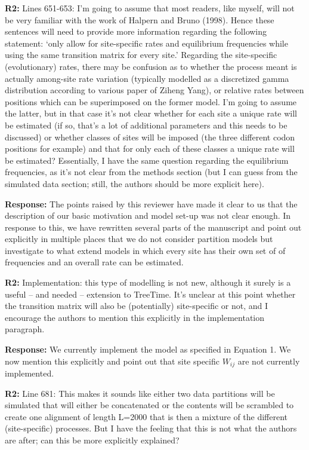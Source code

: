 \documentclass[aps,rmp,onecolumn]{revtex4-1}
\newcommand{\refb}[1]{\textbf{R2:} #1}
\newcommand{\response}[1]{{\color{black}\textbf{Response:} #1}}
\begin{document}
\refb{Lines 651-653: I’m going to assume that most readers, like myself, will not be very familiar with the work of Halpern and Bruno (1998). Hence these sentences will need to provide more information regarding the following statement: ‘only allow for site-specific rates and equilibrium frequencies while using the same transition matrix for every site.’ Regarding the site-specific (evolutionary) rates, there may be confusion as to whether the process meant is actually among-site rate variation (typically modelled as a discretized gamma distribution according to various paper of Ziheng Yang), or relative rates between positions which can be superimposed on the former model. I’m going to assume the latter, but in that case it’s not clear whether for each site a unique rate will be estimated (if so, that’s a lot of additional parameters and this needs to be discussed) or whether classes of sites will be imposed (the three different codon positions for example) and that for only each of these classes a unique rate will be estimated? Essentially, I have the same question regarding the equilibrium frequencies, as it’s not clear from the methods section (but I can guess from the simulated data section; still, the authors should be more explicit here).}

\response{
The points raised by this reviewer have made it clear to us that the description of our basic motivation and model set-up was not clear enough. In response to this, we have rewritten several parts of the manuscript and point out explicitly in multiple places that we do not consider partition models but investigate to what extend models in which every site has their own set of of frequencies and an overall rate can be estimated. }


\refb{Implementation: this type of modelling is not new, although it surely is a useful -- and needed -- extension to TreeTime. It’s unclear at this point whether the transition matrix will also be (potentially) site-specific or not, and I encourage the authors to mention this explicitly in the implementation paragraph.}

\response{We currently implement the model as specified in Equation 1. We now mention this explicitly and point out that site specific $W_{ij}$ are not currently implemented.}


\refb{Line 681: This makes it sounds like either two data partitions will be simulated that will either be concatenated or the contents will be scrambled to create one alignment of length L=2000 that is then a mixture of the different (site-specific) processes. But I have the feeling that this is not what the authors are after; can this be more explicitly explained?}
\end{document}
